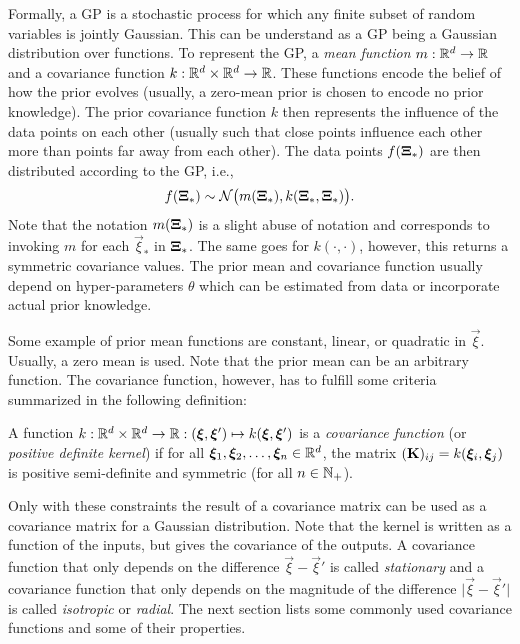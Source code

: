 		Formally, a GP is a stochastic process for which any finite subset of random variables is jointly Gaussian. This can be understand as a GP being a Gaussian distribution over functions. To represent the GP, a \emph{mean function} \( m : \mathbb{R}^d \to \mathbb{R} \) and a covariance function \( k : \mathbb{R}^d \times \mathbb{R}^d \to \mathbb{R} \). These functions encode the belief of how the prior evolves (usually, a zero-mean prior is chosen to encode no prior knowledge). The prior covariance function \(k\) then represents the influence of the data points on each other (usually such that close points influence each other more than points far away from each other). The data points \( f(\bm{\mathrm{\Xi}}_\ast) \) are then distributed according to the GP, i.e.,
		\begin{equation}
			f(\bm{\mathrm{\Xi}}_\ast) \sim \mathcal{N}\bigl( m(\bm{\mathrm{\Xi}}_\ast), k(\bm{\mathrm{\Xi}}_\ast, \bm{\mathrm{\Xi}}_\ast) \bigr).
		\end{equation}
		Note that the notation \( m(\bm{\mathrm{\Xi}}_\ast) \) is a slight abuse of notation and corresponds to invoking \(m\) for each \(\vec{\xi}_\ast\) in \(\bm{\mathrm{\Xi}}_\ast\). The same goes for \( k(\cdot, \cdot) \), however, this returns a symmetric covariance values. The prior mean and covariance function usually depend on hyper-parameters \(\theta\) which can be estimated from data or incorporate actual prior knowledge.

		Some example of prior mean functions are constant, linear, or quadratic in \(\vec{\xi}\). Usually, a zero mean is used. Note that the prior mean can be an arbitrary function. The covariance function, however, has to fulfill some criteria summarized in the following definition:
		\begin{definition}
			A function \( k : \mathbb{R}^d \times \mathbb{R}^d \to \mathbb{R} : (\bm{\xi}, \bm{\xi}') \mapsto k(\bm{\xi}, \bm{\xi}') \) is a \emph{covariance function} (or \emph{positive definite kernel}) if for all \( \bm{\xi}_1, \bm{\xi}_2, \dots, \bm{\xi}_n \in \mathbb{R}^d \), the matrix \( (\bm{\mathrm{K}})_{ij} = k(\bm{\xi}_i, \bm{\xi}_j) \) is positive semi-definite and symmetric (for all \(n \in \mathbb{N}_+\)).
		\end{definition}
		Only with these constraints the result of a covariance matrix can be used as a covariance matrix for a Gaussian distribution. Note that the kernel is written as a function of the inputs, but gives the covariance of the outputs. A covariance function that only depends on the difference \( \vec{\xi} - \vec{\xi}' \) is called \emph{stationary} and a covariance function that only depends on the magnitude of the difference \( \lvert \vec{\xi} - \vec{\xi}' \rvert \) is called \emph{isotropic} or \emph{radial}. The next section lists some commonly used covariance functions and some of their properties.


